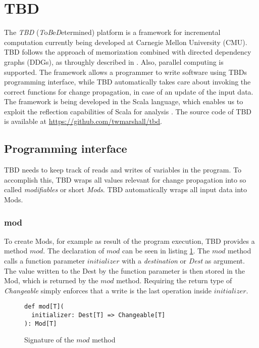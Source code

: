 \section{TBD}
\label{sec:tbd}
The \textit{TBD} (\textit{T}o\textit{B}e\textit{D}etermined) platform is a framework for incremental computation currently being developed at Carnegie Mellon University (CMU). TBD follows the approach of memorization combined with directed dependency graphs (DDGs), as throughly described in \cite{Acar2005thesis}. Also, parallel computing is supported. The framework allows a programmer to write software using TBDs programming interface, while TBD automatically takes care about invoking the correct functions for change propagation, in case of an update of the input data.
The framework is being developed in the Scala language, which enables us to exploit the reflection capabilities of Scala for analysis \cite{burmako2013scala} \cite{stocker2010scala}. 
The source code of TBD is available at \hyperref[]{https://github.com/twmarshall/tbd}. 

\subsection{Programming interface} 
TBD needs to keep track of reads and writes of variables in the program. To accomplish this, TBD wraps all values relevant for change propagation into so called \textit{modifiables} or short \textit{Mods}. TBD automatically wraps all input data into Mods. 

\subsubsection{mod}
To create Mods, for example as result of the program execution, TBD provides a method $mod$. The declaration of $mod$ can be seen in listing \ref{code:mod}. The $mod$ method calls a function parameter $initializer$ with a \textit{destination} or \textit{Dest} as argument. The value written to the Dest by the function parameter is then stored in the Mod, which is returned by the $mod$ method. Requiring the return type of \textit{Changeable} simply enforces that a write is the last operation inside $initializer$. 

\begin{figure}
\begin{lstlisting}[frame=single,basicstyle=\ttfamily]
def mod[T](
  initializer: Dest[T] => Changeable[T]
): Mod[T]
\end{lstlisting}
\caption{Signature of the $mod$ method}
\label{code:mod}
\end{figure}

